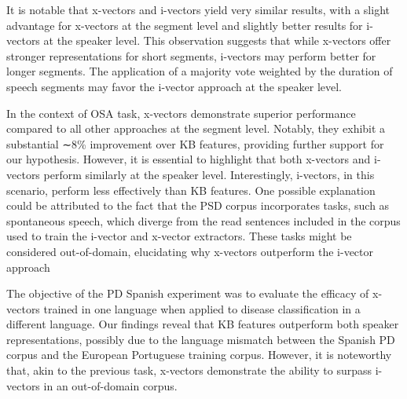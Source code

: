 It is notable that x-vectors and i-vectors yield very similar results, with a slight advantage for x-vectors at the segment level and slightly better results for i-vectors at the speaker level. This observation suggests that while x-vectors offer stronger representations for short segments, i-vectors may perform better for longer segments. The application of a majority vote weighted by the duration of speech segments may favor the i-vector approach at the speaker level.

In the context of OSA task, x-vectors demonstrate superior performance compared to all other approaches at the segment level. Notably, they exhibit a substantial ∼8\% improvement over KB features, providing further support for our hypothesis. However, it is essential to highlight that both x-vectors and i-vectors perform similarly at the speaker level. Interestingly, i-vectors, in this scenario, perform less effectively than KB features. One possible explanation could be attributed to the fact that the PSD corpus incorporates tasks, such as spontaneous speech, which diverge from the read sentences included in the corpus used to train the i-vector and x-vector extractors. These tasks might be considered out-of-domain, elucidating why x-vectors outperform the i-vector approach

The objective of the PD Spanish experiment was to evaluate the efficacy of x-vectors trained in one language when applied to disease classification in a different language. Our findings reveal that KB features outperform both speaker representations, possibly due to the language mismatch between the Spanish PD corpus and the European Portuguese training corpus. However, it is noteworthy that, akin to the previous task, x-vectors demonstrate the ability to surpass i-vectors in an out-of-domain corpus.

